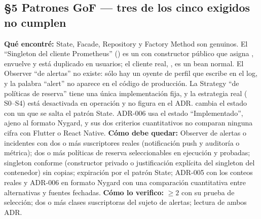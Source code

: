 \subsection*{\S5 Patrones GoF --- tres de los cinco exigidos no cumplen}
\textbf{Qu\'e encontr\'e:} State, Facade, Repository y Factory Method son genuinos. El ``Singleton del cliente Prometheus'' () es un  con constructor p\'ublico que asigna , envuelve  y est\'a duplicado en usuarios; el cliente real, , es un bean normal. El Observer ``de alertas'' no existe: s\'olo hay un oyente de perfil que escribe en el log, y la palabra ``alert'' no aparece en el c\'odigo de producci\'on. La Strategy ``de pol\'iticas de reserva'' tiene una \'unica implementaci\'on fija, y la estrategia real ( S0--S4) est\'a desactivada en operaci\'on y no figura en el ADR.  cambia el estado con un  que se salta el patr\'on State. ADR-006 usa el estado ``Implementado'', ajeno al formato Nygard, y sus dos criterios cuantitativos no comparan ninguna cifra con Flutter o React Native. \textbf{C\'omo debe quedar:} Observer de alertas o incidentes con dos o m\'as suscriptores reales (notificaci\'on push y auditor\'ia o m\'etrica); dos o m\'as pol\'iticas de reserva seleccionables en ejecuci\'on y probadas; singleton conforme (constructor privado o justificaci\'on expl\'icita del singleton del contenedor) sin copias; expiraci\'on por el patr\'on State; ADR-005 con los conteos reales y ADR-006 en formato Nygard con una comparaci\'on cuantitativa entre alternativas y fuentes fechadas. \textbf{C\'omo lo verifico:}  $\ge 2$ con su prueba de selecci\'on; dos o m\'as clases suscriptoras del sujeto de alertas; lectura de ambos ADR.

